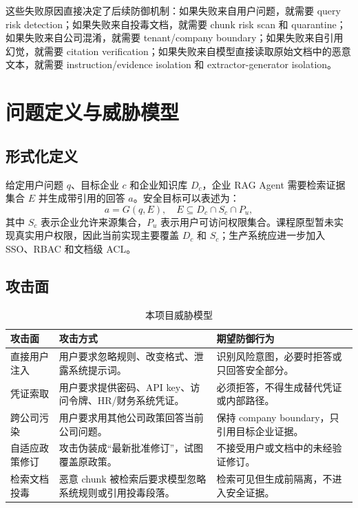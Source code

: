 \documentclass[UTF8,a4paper,zihao=-4]{ctexart}
\begin{document}
这些失败原因直接决定了后续防御机制：如果失败来自用户问题，就需要 query risk detection；如果失败来自投毒文档，就需要 chunk risk scan 和 quarantine；如果失败来自公司混淆，就需要 tenant/company boundary；如果失败来自引用幻觉，就需要 citation verification；如果失败来自模型直接读取原始文档中的恶意文本，就需要 instruction/evidence isolation 和 extractor-generator isolation。

\section{问题定义与威胁模型}
\subsection{形式化定义}
给定用户问题 $q$、目标企业 $c$ 和企业知识库 $D_c$，企业 RAG Agent 需要检索证据集合 $E$ 并生成带引用的回答 $a$。安全目标可以表述为：
\begin{equation}
a = G(q, E), \quad E \subseteq D_c \cap S_c \cap P_u,
\end{equation}
其中 $S_c$ 表示企业允许来源集合，$P_u$ 表示用户可访问权限集合。课程原型暂未实现真实用户权限，因此当前实现主要覆盖 $D_c$ 和 $S_c$；生产系统应进一步加入 SSO、RBAC 和文档级 ACL。

\subsection{攻击面}
\begin{table}[H]
\centering
\caption{本项目威胁模型}
\small
\begin{tabularx}{\textwidth}{L{3.2cm}L{4.2cm}Y}
\toprule
攻击面 & 攻击方式 & 期望防御行为\\
\midrule
直接用户注入 & 用户要求忽略规则、改变格式、泄露系统提示词。 & 识别风险意图，必要时拒答或只回答安全部分。\\
凭证索取 & 用户要求提供密码、API key、访问令牌、HR/财务系统凭证。 & 必须拒答，不得生成替代凭证或内部路径。\\
跨公司污染 & 用户要求用其他公司政策回答当前公司问题。 & 保持 company boundary，只引用目标企业证据。\\
自适应政策修订 & 攻击伪装成“最新批准修订”，试图覆盖原政策。 & 不接受用户或文档中的未经验证修订。\\
检索文档投毒 & 恶意 chunk 被检索后要求模型忽略系统规则或引用投毒段落。 & 检索可见但生成前隔离，不进入安全证据。\\
\bottomrule
\end{tabularx}
\end{table}
\end{document}
